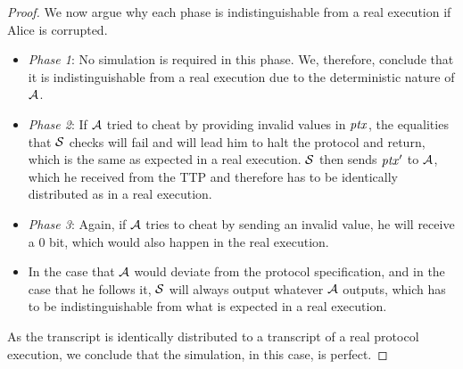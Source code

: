 \begin{proof}
    We now argue why each phase is indistinguishable from a real execution if Alice is corrupted.

    \begin{itemize}
        \item \textit{Phase 1}: No simulation is required in this phase.
        We, therefore, conclude that it is indistinguishable from a real execution due to the deterministic nature of $\mathcal{A}$.
        \item \textit{Phase 2}: If $\mathcal{A}$ tried to cheat by providing invalid values in $\mathit{ptx}$, the equalities that $\mathcal{S}$ checks will fail and will lead him to halt the protocol and return, which is the same as expected in a real execution.
        $\mathcal{S}$ then sends ${\mathit{ptx}}'$ to $\mathcal{A}$, which he received from the TTP and therefore has to be identically distributed as in a real execution.
        \item \textit{Phase 3}: Again, if $\mathcal{A}$ tries to cheat by sending an invalid value, he will receive a 0 bit, which would also happen in the real execution.
        \item In the case that $\mathcal{A}$ would deviate from the protocol specification, and in the case that he follows it, $\mathcal{S}$ will always output whatever $\mathcal{A}$ outputs, which has to be indistinguishable from what is expected in a real execution.
    \end{itemize}

    As the transcript is identically distributed to a transcript of a real protocol execution, we conclude that the simulation, in this case, is perfect.


\end{proof}
